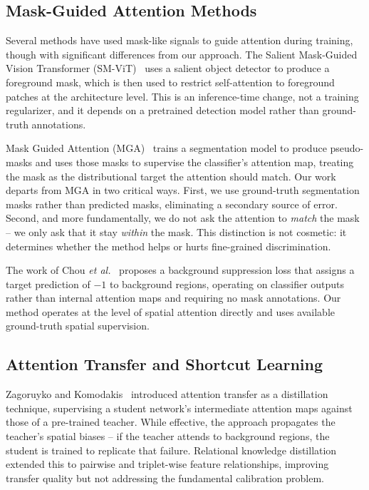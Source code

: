 \documentclass[journal]{IEEEtran}
\begin{document}
\subsection{Mask-Guided Attention Methods}

Several methods have used mask-like signals to guide attention
during training, though with significant differences from our
approach. The Salient Mask-Guided Vision Transformer
(SM-ViT)~\cite{smvit2023} uses a salient object detector to produce
a foreground mask, which is then used to restrict self-attention
to foreground patches at the architecture level. This is an
inference-time change, not a training regularizer, and it depends
on a pretrained detection model rather than ground-truth
annotations.

Mask Guided Attention (MGA)~\cite{wang2021mga} trains a
segmentation model to produce pseudo-masks and uses those masks
to supervise the classifier's attention map, treating the mask
as the distributional target the attention should match. Our
work departs from MGA in two critical ways. First, we use
ground-truth segmentation masks rather than predicted masks,
eliminating a secondary source of error. Second, and more
fundamentally, we do not ask the attention to \emph{match}
the mask -- we only ask that it stay \emph{within} the mask.
This distinction is not cosmetic: it determines whether the
method helps or hurts fine-grained discrimination.

The work of Chou \emph{et al.}~\cite{chou2023background} proposes
a background suppression loss that assigns a target prediction
of $-1$ to background regions, operating on classifier outputs
rather than internal attention maps and requiring no mask
annotations. Our method operates at the level of spatial
attention directly and uses available ground-truth spatial
supervision.

\subsection{Attention Transfer and Shortcut Learning}

Zagoruyko and Komodakis~\cite{zagoruyko2017paying} introduced
attention transfer as a distillation technique, supervising a
student network's intermediate attention maps against those of
a pre-trained teacher. While effective, the approach propagates
the teacher's spatial biases -- if the teacher attends to background
regions, the student is trained to replicate that failure.
Relational knowledge distillation~\cite{park2019relational} extended
this to pairwise and triplet-wise feature relationships, improving
transfer quality but not addressing the fundamental calibration
problem.
\end{document}
